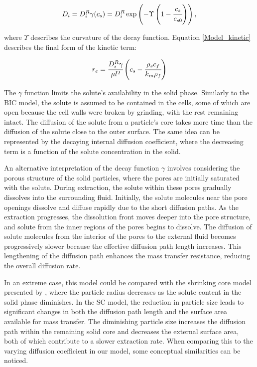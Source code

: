 \documentclass[a4paper,fleqn]{cas-dc}
\begin{document}
	{\footnotesize
		\begin{equation}
			D_i = D_i^R \gamma(c_s) = D_i^R \exp \left( - \Upsilon \left( 1-\cfrac{ c_s }{c_{s0}} \right) \right), \label{EQ: C_sat_function}
	\end{equation} }
	
	where  $\Upsilon$ describes the curvature of the decay function. Equation \ref{Model_kinetic} describes the final form of the kinetic term:
	
	{\footnotesize
		\begin{equation}
			\label{Model_kinetic}
			r_e = \cfrac{D_i^R \gamma }{ \mu l^2 } \left( c_s  - \cfrac{\rho_s c_f }{ k_m \rho_f }  \right)
	\end{equation} }
	
	The $\gamma$ function limits the solute's availability in the solid phase. Similarly to the BIC model, the solute is assumed to be contained in the cells, some of which are open because the cell walls were broken by grinding, with the rest remaining intact. The diffusion of the solute from a particle's core takes more time than the diffusion of the solute close to the outer surface. The same idea can be represented by the decaying internal diffusion coefficient, where the decreasing term is a function of the solute concentration in the solid. 
	
	An alternative interpretation of the decay function $\gamma$ involves considering the porous structure of the solid particles, where the pores are initially saturated with the solute. During extraction, the solute within these pores gradually dissolves into the surrounding fluid. Initially, the solute molecules near the pore openings dissolve and diffuse rapidly due to the short diffusion paths. As the extraction progresses, the dissolution front moves deeper into the pore structure, and solute from the inner regions of the pores begins to dissolve. The diffusion of solute molecules from the interior of the pores to the external fluid becomes progressively slower because the effective diffusion path length increases. This lengthening of the diffusion path enhances the mass transfer resistance, reducing the overall diffusion rate. 
	
	In an extreme case, this model could be compared with the shrinking core model presented by \citet{Goto1996}, where the particle radius decreases as the solute content in the solid phase diminishes. In the SC model, the reduction in particle size leads to significant changes in both the diffusion path length and the surface area available for mass transfer. The diminishing particle size increases the diffusion path within the remaining solid core and decreases the external surface area, both of which contribute to a slower extraction rate. When comparing this to the varying diffusion coefficient in our model, some conceptual similarities can be noticed.
	
\end{document}
